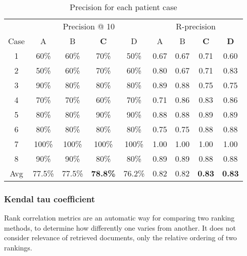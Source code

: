 \documentclass[a4paper, 11pt]{article}
\begin{document}
\begin{table}[tbp] \footnotesize \center
\caption{Precision for each patient case\label{tab:precision}}
\begin{tabular}{c c c c c c c c c}
    \toprule
    & \multicolumn{4}{c}{Precision @ 10} & \multicolumn{4}{c}{R-precision} \\
	\cmidrule(r){2-9}
	Case & A & B & \textbf{C} & D & A & B & \textbf{C} & \textbf{D} \\
    \midrule
	1 & 60\% & 60\% & 70\% & 50\% & 0.67 & 0.67 & 0.71 & 0.60 \\
	2 & 50\% & 60\% & 70\% & 60\% & 0.80 & 0.67 & 0.71 & 0.83 \\
	3 & 90\% & 80\% & 80\% & 80\% & 0.89 & 0.88 & 0.75 & 0.75 \\
	4 & 70\% & 70\% & 60\% & 70\% & 0.71 & 0.86 & 0.83 & 0.86 \\
	5 & 80\% & 80\% & 90\% & 90\% & 0.88 & 0.88 & 0.89 & 0.89 \\
	6 & 80\% & 80\% & 80\% & 80\% & 0.75 & 0.75 & 0.88 & 0.88 \\
	7 & 100\% & 100\% & 100\% & 100\% & 1.00 & 1.00 & 1.00 & 1.00 \\
	8 & 90\% & 90\% & 80\% & 80\% & 0.89 & 0.89 & 0.88 & 0.88 \\
    \midrule
	Avg & 77.5\% & 77.5\% & \textbf{78.8\%} & 76.2\% & 0.82 & 0.82 & \textbf{0.83} & \textbf{0.83} \\
	\bottomrule
\end{tabular}
\end{table}

\subsubsection{Kendal tau coefficient}
Rank correlation metrics are an automatic way for comparing two ranking
methods, to determine how differently one varies from another. It does not
consider relevance of retrieved documents, only the relative ordering of two
rankings.
\end{document}
